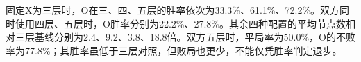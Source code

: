 固定X为三层时，O在三、四、五层的胜率依次为33.3\%、61.1\%、72.2\%。双方同时使用四层、五层时，O胜率分别为22.2\%、27.8\%。其余四种配置的平均节点数相对三层基线分别为2.4、9.2、3.8、18.8倍。双方五层时，平局率为50.0\%，O的不败率为77.8\%；其胜率虽低于三层对照，但败局也更少，不能仅凭胜率判定退步。
